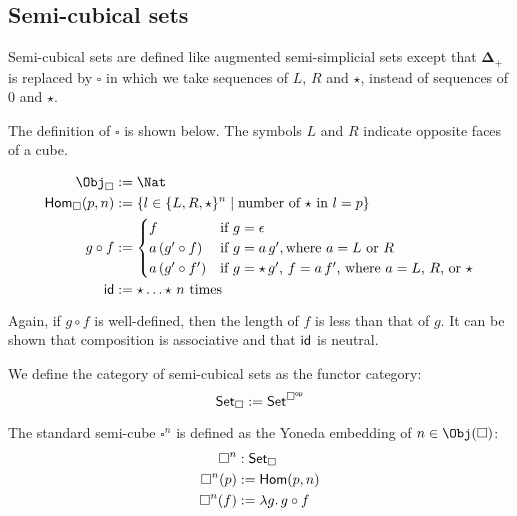 \documentclass{msc}
\newcommand{\DeltaPlus}{\ensuremath{\boldsymbol{\Delta}_+}}
\newcommand{\Cube}{\ensuremath{\boldsymbol{{\square}}}}
\newcommand{\CSet}{\ensuremath{\mathsf{Set}_{\boldsymbol{\square}}}}
\newcommand{\kstar}{{\star}}
\begin{document}
\subsection*{Semi-cubical sets}
Semi-cubical sets are defined like augmented semi-simplicial sets except that $\DeltaPlus$ is replaced by $\Cube$ in which we take sequences of $L$, $R$ and $\kstar$, instead of sequences of $0$ and $\kstar$.

\begin{definition}[\Cube]
  The definition of $\Cube$ is shown below. The symbols $L$ and $R$ indicate opposite faces of a cube.

  \begin{align*}
    \Obj_{\Cube}       & := \Nat                                                                          \\
    \Hom_{\Cube}(p, n) & := \{l \in \{L, R, \kstar\}^n \mid \text{number of $\kstar$ in $l = p$}\}        \\
    g \circ f          & :=
    \begin{cases}
      f                  & \text{if $g = \epsilon$}                                                               \\
      a\,(g' \circ f)  & \text{if $g = a\,g'$}, \text{where $a = L$ or $R$}                           \\
      a\,(g' \circ f') & \text{if $g = \kstar\,g'$, $f = a\,f'$, where $a = L$, $R$, or $\kstar$} \\
    \end{cases} \\
    \id                & := \kstar \ldots \kstar \text{ $n$ times}
  \end{align*}

  Again, if $g \circ f$ is well-defined, then the length of $f$ is less than that of $g$. It can be shown that composition is associative and that $\mathsf{id}$ is neutral.
\end{definition}

\begin{definition}[\CSet]
  We define the category of semi-cubical sets as the functor category:
  \begin{equation*}
    \CSet := \Set^{\op{\Cube}}
  \end{equation*}
\end{definition}

\begin{definition}[$\Cube^n$]
  The standard semi-cube $\Cube^n$ is defined as the Yoneda embedding of $n \in \Obj(\Cube)$:
  \begin{align*}
    \Cube^n    & : \CSet                    \\
    \Cube^n(p) & := \Hom(p, n)              \\
    \Cube^n(f) & := \lambda g .\, g \circ f
  \end{align*}
\end{definition}
\end{document}
